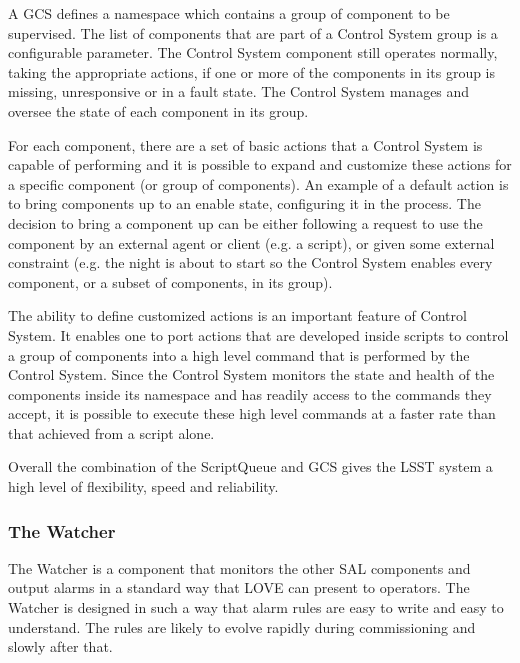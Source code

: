 A GCS defines a namespace which contains a group of component to be supervised. The list of components that are part of a Control System group is a configurable parameter. The Control System component still operates normally, taking the appropriate actions, if one or more of the components in its group is missing, unresponsive or in a fault state. The Control System manages and oversee the state of each component in its group.

For each component, there are a set of basic actions that a Control System is capable of performing and it is possible to expand and customize these actions for a specific component (or group of components). An example of a default action is to bring components up to an enable state, configuring it in the process. The decision to bring a component up can be either following a request to use the component by an external agent or client (e.g. a script), or given some external constraint (e.g. the night is about to start so the Control System enables every component, or a subset of components, in its group).

The ability to define customized actions is an important feature of Control System. It enables one to port actions that are developed inside scripts to control a group of components into a high level command that is performed by the Control System. Since the Control System monitors the state and health of the components inside its namespace and has readily access to the commands they accept, it is possible to execute these high level commands at a faster rate than that achieved from a script alone.

Overall the combination of the ScriptQueue and GCS gives the LSST system a high level of flexibility, speed and reliability.



\subsubsection{The Watcher}\label{sect:watcher}
The Watcher is a component that monitors the other SAL components and output alarms in a standard way that LOVE can present to operators. The Watcher is designed in such a way that alarm rules are easy to write and easy to understand. The rules are likely to evolve rapidly during commissioning and slowly after that.

